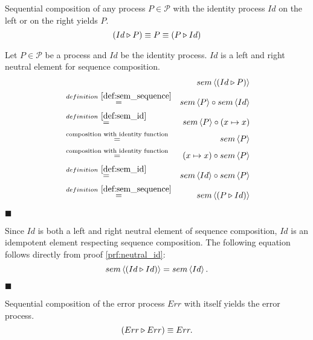 \begin{theorem}
\label{thm:idempotence_identity}
Sequential composition of any process $P \in \mathcal{P}$ with the identity process $Id$ on the left or on the right yields $P$.
\begin{equation*}
  \left( Id \triangleright P \right) \equiv P \equiv \left( P \triangleright Id \right)
\end{equation*}
\end{theorem}

\begin{myproof}
\label{prf:neutral_id}
Let $P \in \mathcal{P}$ be a process and $Id$ be the identity process. $Id$ is a left and right neutral element for sequence composition.
\begin{eqnarray*}
  & & \sem{\sequence{Id}{P}} \\
    & \overset{\defref{def:sem_sequence}}{=} & \sem{P} \circ \sem{Id} \\
    & \overset{\defref{def:sem_id}}{=} & \sem{P} \circ \left( x \mapsto x \right) \\
    & \overset{\text{composition with identity function}}{=} & \sem{P} \\
    & \overset{\text{composition with identity function}}{=} & \left( x \mapsto x \right) \circ \sem{P} \\
    & \overset{\defref{def:sem_id}}{=} & \sem{Id} \circ \sem{P} \\
    & \overset{\defref{def:sem_sequence}}{=} & \sem{\sequence{P}{Id}} \\
\end{eqnarray*}

\hfill$\blacksquare$
\end{myproof}


\begin{corollary}
Since $Id$ is both a left and right neutral element of sequence composition, $Id$ is an idempotent element respecting sequence composition. The following equation follows directly from proof \ref{prf:neutral_id}:
\begin{equation*}
  sem \left\langle \left( Id \triangleright Id \right) \right\rangle = sem \left\langle Id \right\rangle.
\end{equation*}

\hfill$\blacksquare$
\end{corollary}


\begin{theorem}
\label{thm:idempotence_identity}
Sequential composition of the error process $Err$ with itself yields the error process.
\begin{equation*}
  \left( Err \triangleright Err \right) \equiv Err.
\end{equation*}
\end{theorem}

